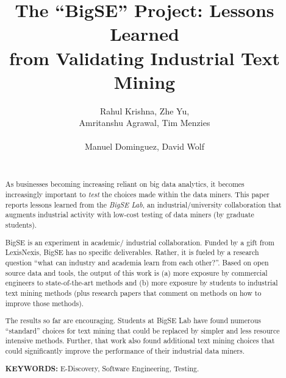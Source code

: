 \documentclass{sig-alternate-05-2015}
\theoremstyle{break}
\begin{document}

\title{The ``BigSE'' Project: Lessons Learned \\from Validating  Industrial Text Mining  }
\author{
\alignauthor
Rahul Krishna,  Zhe Yu, \\ Amritanshu Agrawal, Tim Menzies\\ %
       \\
\alignauthor
Manuel Dominguez,  David Wolf \\%
       \\
}
\maketitle


\begin{abstract}

As businesses becoming increasing reliant on big data   analytics, it becomes
increasingly important to {\em test} the choices made within the data miners.
This paper reports   lessons learned from the  {\em BigSE Lab}, an industrial/university
collaboration that augments industrial activity with low-cost testing
of data miners (by  graduate students).  

 BigSE is an experiment in academic/ industrial collaboration.
  Funded by a gift from LexisNexis, BigSE has no specific deliverables. Rather, it is fueled by a research question ``what can
  industry and academia learn from each other?''. Based on open source
  data and tools, the output of this work is (a) more exposure by commercial engineers to state-of-the-art methods and (b) more
  exposure by  students
    to  industrial text mining methods (plus research
  papers that comment on methods on how to improve  those methods).

The results so far are encouraging. Students
at  BigSE Lab have found numerous ``standard'' choices for
text mining that could be replaced by  simpler and less resource intensive methods. Further, that   work also found additional text mining choices   that could significantly improve the performance of their
industrial data miners.
 

{\bf KEYWORDS:}
E-Discovery,  Software Engineering, Testing.

\end{abstract}
\end{document}
